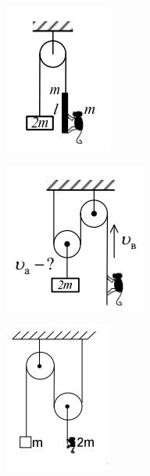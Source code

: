 \begin{problem}{3}
\begin{figure}[h!]
\begin{subfigure}{.4\textwidth}
	\end{subfigure}
	\begin{subfigure}{.4\textwidth}
		\centering
		\includegraphics[width=0.5\linewidth]{class7/lev_449}
		\caption{}
		\label{fig:lev449}
	\end{subfigure}
	\begin{subfigure}{.4\textwidth}
		\centering
		\includegraphics[width=0.5\linewidth]{class7/lev_451}
		\caption{}
		\label{fig:lev451}
	\end{subfigure}
	\begin{subfigure}{.4\textwidth}
		\centering
		\includegraphics[width=0.5\linewidth]{class7/lev_453}

\end{subfigure}
\end{figure}
\end{problem}

